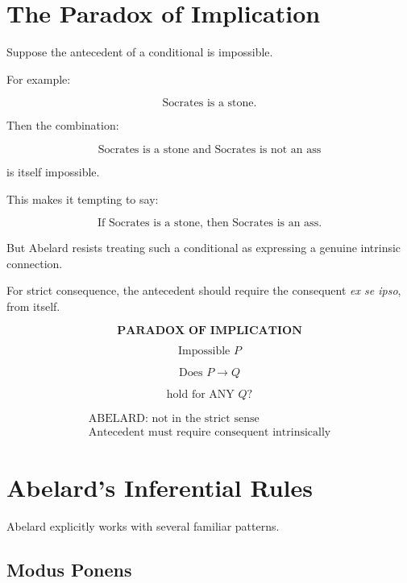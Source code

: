 \documentclass[11pt]{article}
\newcommand{\latin}[1]{\textit{#1}}
\begin{document}
\section{The Paradox of Implication}

Suppose the antecedent of a conditional is impossible.

For example:

\[
\text{Socrates is a stone.}
\]

Then the combination:

\[
\text{Socrates is a stone and Socrates is not an ass}
\]

is itself impossible.

This makes it tempting to say:

\[
\text{If Socrates is a stone, then Socrates is an ass.}
\]

But Abelard resists treating such a conditional as expressing a
genuine intrinsic connection.

For strict consequence, the antecedent should require the
consequent \latin{ex se ipso}, from itself.

\begin{whiteboard}
\[
\textbf{PARADOX OF IMPLICATION}
\]

\[
\text{Impossible }P
\]

\[
\text{Does }P \rightarrow Q
\]

\[
\text{hold for ANY }Q?
\]

\[
\boxed{
\begin{array}{c}
\text{ABELARD: not in the strict sense}\\
\text{Antecedent must require consequent intrinsically}
\end{array}
}
\]
\end{whiteboard}

\section{Abelard's Inferential Rules}

Abelard explicitly works with several familiar patterns.

\subsection*{Modus Ponens}
\end{document}

